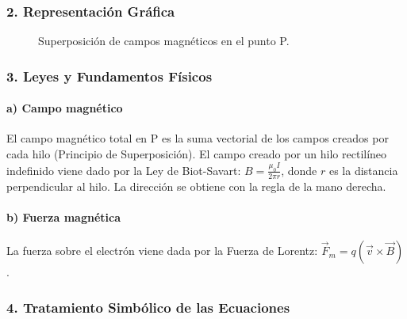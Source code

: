\subsubsection*{2. Representación Gráfica}
\begin{figure}[H]
    \centering
    \caption{Superposición de campos magnéticos en el punto P.}
\end{figure}

\subsubsection*{3. Leyes y Fundamentos Físicos}
\paragraph*{a) Campo magnético}
El campo magnético total en P es la suma vectorial de los campos creados por cada hilo (Principio de Superposición). El campo creado por un hilo rectilíneo indefinido viene dado por la Ley de Biot-Savart: $B = \frac{\mu_0 I}{2\pi r}$, donde $r$ es la distancia perpendicular al hilo. La dirección se obtiene con la regla de la mano derecha.
\paragraph*{b) Fuerza magnética}
La fuerza sobre el electrón viene dada por la Fuerza de Lorentz: $\vec{F}_m = q(\vec{v} \times \vec{B})$.

\subsubsection*{4. Tratamiento Simbólico de las Ecuaciones}
